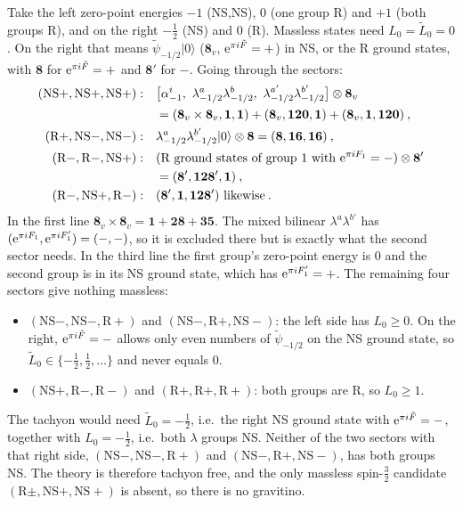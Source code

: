 \begin{tcolorbox}[breakable]
	\begin{remark}
		Take the left zero-point energies $-1$ (NS,NS), $0$ (one group R) and $+1$ (both groups R), and on the right $-\frac{1}{2}$ (NS) and $0$ (R). Massless states need $L_{0}=\tilde{L}_{0}=0$. On the right that means $\tilde{\psi}_{-1/2}\lvert0\rangle$ ($\mathbf{8}_{v}$, $\mathrm{e}^{\pi i\tilde{F}}=+$) in NS, or the R ground states, with $\mathbf{8}$ for $\mathrm{e}^{\pi i\tilde{F}}=+$ and $\mathbf{8}'$ for $-$. Going through the sectors:
		\begin{align*}
			(\text{NS}+,\text{NS}+,\text{NS}+):&\quad \bigl[\alpha^{i}_{-1},\ \lambda^{a}_{-1/2}\lambda^{b}_{-1/2},\ \lambda^{a'}_{-1/2}\lambda^{b'}_{-1/2}\bigr]\otimes\mathbf{8}_{v}\\
			&\quad=(\mathbf{8}_{v}\times\mathbf{8}_{v},\mathbf{1},\mathbf{1})+(\mathbf{8}_{v},\mathbf{120},\mathbf{1})+(\mathbf{8}_{v},\mathbf{1},\mathbf{120})\:,\\
			(\text{R}+,\text{NS}-,\text{NS}-):&\quad \lambda^{a}_{-1/2}\lambda^{b'}_{-1/2}\lvert0\rangle\otimes\mathbf{8}=(\mathbf{8},\mathbf{16},\mathbf{16})\:,\\
			(\text{R}-,\text{R}-,\text{NS}+):&\quad (\text{R ground states of group 1 with }\me^{\pi\mi F_{1}}=-)\otimes\mathbf{8}'\\
			&\quad=(\mathbf{8}',\mathbf{128}',\mathbf{1})\:,\\
			(\text{R}-,\text{NS}+,\text{R}-):&\quad (\mathbf{8}',\mathbf{1},\mathbf{128}')\ \text{likewise}\:.
		\end{align*}
		In the first line $\mathbf{8}_{v}\times\mathbf{8}_{v}=\mathbf{1}+\mathbf{28}+\mathbf{35}$. The mixed bilinear $\lambda^{a}\lambda^{b'}$ has $(\mathrm{e}^{\pi i F_{1}},\mathrm{e}^{\pi i F_{1}'})=(-,-)$, so it is excluded there but is exactly what the second sector needs. In the third line the first group's zero-point energy is $0$ and the second group is in its NS ground state, which has $\mathrm{e}^{\pi i F_{1}'}=+$. The remaining four sectors give nothing massless:
		\begin{itemize}
			\item $(\text{NS}-,\text{NS}-,\text{R}+)$ and $(\text{NS}-,\text{R}+,\text{NS}-)$: the left side has $L_{0}\geq0$. On the right, $\mathrm{e}^{\pi i\tilde{F}}=-$ allows only even numbers of $\tilde{\psi}_{-1/2}$ on the NS ground state, so $\tilde{L}_{0}\in\{-\frac{1}{2},\frac{1}{2},\dots\}$ and never equals $0$.
			\item $(\text{NS}+,\text{R}-,\text{R}-)$ and $(\text{R}+,\text{R}+,\text{R}+)$: both groups are R, so $L_{0}\geq1$.
		\end{itemize}
		The tachyon would need $\tilde{L}_{0}=-\frac{1}{2}$, i.e.\ the right NS ground state with $\mathrm{e}^{\pi i\tilde{F}}=-$, together with $L_{0}=-\frac{1}{2}$, i.e.\ both $\lambda$ groups NS. Neither of the two sectors with that right side, $(\text{NS}-,\text{NS}-,\text{R}+)$ and $(\text{NS}-,\text{R}+,\text{NS}-)$, has both groups NS. The theory is therefore tachyon free, and the only massless spin-$\frac{3}{2}$ candidate $(\text{R}\pm,\text{NS}+,\text{NS}+)$ is absent, so there is no gravitino.
	\end{remark}
\end{tcolorbox}


